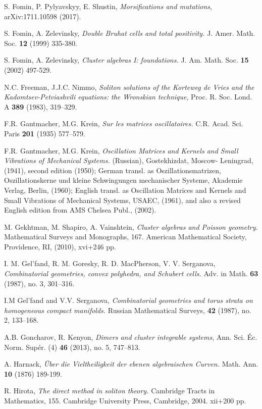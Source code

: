 \documentclass[11pt]{amsart}
\theoremstyle{plain}
\numberwithin{equation}{section}
\begin{document}
\begin{thebibliography}{111}
 S. Fomin, P. Pylyavskyy, E. Shustin, {\em Morsifications and mutations}, arXiv:1711.10598 (2017).

 S. Fomin, A. Zelevinsky, {\em Double Bruhat cells and total positivity.} J. Amer. Math. Soc. {\bf 12} (1999) 335-380.

 S. Fomin, A. Zelevinsky, {\em Cluster algebras I: foundations.} J. Am. Math. Soc. {\bf 15} (2002) 497-529.
 
 N.C. Freeman, J.J.C. Nimmo, {\em Soliton solutions of the Korteweg de Vries and the Kadomtsev-Petviashvili equations: the Wronskian technique}, 
Proc. R. Soc. Lond. A {\bf 389} (1983), 319--329.

 F.R. Gantmacher, M.G. Krein, {\em Sur les matrices oscillatoires.} C.R. Acad. Sci. Paris
{\bf 201} (1935) 577--579.

 F.R. Gantmacher, M.G. Krein, {\em Oscillation Matrices and Kernels and Small Vibrations of Mechanical Systems.} (Russian), Gostekhizdat, Moscow-
Leningrad, (1941), second edition (1950); German transl. as Oszillationsmatrizen, Oszillationskerne und kleine Schwingungen mechanischer Systeme, Akademie
Verlag, Berlin, (1960); English transl. as Oscillation Matrices and Kernels and Small Vibrations of Mechanical Systems, USAEC, (1961), and also a revised
English edition from AMS Chelsea Publ., (2002).

  M. Gekhtman, M. Shapiro, A. Vainshtein, {\em Cluster algebras and Poisson geometry.} Mathematical Surveys and Monographs, 167. American Mathematical 
Society, Providence, RI, (2010), xvi+246 pp.

 I. M. Gel'fand, R. M. Goresky, R. D. MacPherson, V. V. Serganova, {\em Combinatorial geometries, convex polyhedra, and Schubert cells.} Adv. in Math. {\bf 63} (1987), no. 3, 301--316.

 I.M Gel'fand and V.V. Serganova, {\em Combinatorial geometries and torus strata on homogeneous compact manifolds.} Russian Mathematical Surveys, {\bf 42} (1987), no. 2,  133--168.

 A.B. Goncharov, R. Kenyon, {\em Dimers and cluster integrable systems}, Ann. Sci. \'Ec. Norm. Sup\'er. (4) {\bf 46} (2013), no. 5, 747--813.

 A. Harnack,  {\em \"Uber die Vieltheiligkeit der ebenen algebraischen Curven.} Math. Ann. {\bf 10} (1876) 189-199.

 R. Hirota, {\em The direct method in soliton theory.} Cambridge Tracts in Mathematics, 155. Cambridge University Press, Cambridge, 2004. xii+200 pp.


\end{thebibliography}
\end{document}
